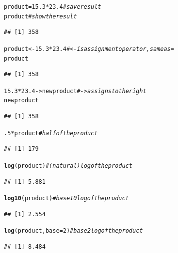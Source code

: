 \documentclass[twoside]{book}\usepackage[]{graphicx}\usepackage[]{xcolor}
\makeatletter
\newcommand{\hlnum}[1]{\textcolor[rgb]{0.686,0.059,0.569}{#1}}%
\newcommand{\hlcom}[1]{\textcolor[rgb]{0.678,0.584,0.686}{\textit{#1}}}%
\newcommand{\hlopt}[1]{\textcolor[rgb]{0,0,0}{#1}}%
\newcommand{\hlstd}[1]{\textcolor[rgb]{0.345,0.345,0.345}{#1}}%
\newcommand{\hlkwb}[1]{\textcolor[rgb]{0.69,0.353,0.396}{#1}}%
\newcommand{\hlkwc}[1]{\textcolor[rgb]{0.333,0.667,0.333}{#1}}%
\newcommand{\hlkwd}[1]{\textcolor[rgb]{0.737,0.353,0.396}{\textbf{#1}}}%
\newenvironment{kframe}{%
 \def\at@end@of@kframe{}%
 \ifinner\ifhmode%
  \def\at@end@of@kframe{\end{minipage}}%
  \begin{minipage}{\columnwidth}%
 \fi\fi%
 \def\FrameCommand##1{\hskip\@totalleftmargin \hskip-\fboxsep
 \colorbox{shadecolor}{##1}\hskip-\fboxsep
     \hskip-\linewidth \hskip-\@totalleftmargin \hskip\columnwidth}%
 \MakeFramed {\advance\hsize-\width
   \@totalleftmargin\z@ \linewidth\hsize
   \@setminipage}}%
 {\par\unskip\endMakeFramed%
 \at@end@of@kframe}
\newenvironment{knitrout}{}{} %
\makeatother
\begin{document}
\begin{knitrout}
\color{fgcolor}\begin{kframe}
\begin{alltt}
\hlstd{product} \hlkwb{=} \hlnum{15.3} \hlopt{*} \hlnum{23.4}       \hlcom{# save result}
\hlstd{product}                     \hlcom{# show the result}
\end{alltt}
\begin{verbatim}
## [1] 358
\end{verbatim}
\begin{alltt}
\hlstd{product} \hlkwb{<-} \hlnum{15.3} \hlopt{*} \hlnum{23.4}      \hlcom{# <- is assignment operator, same as =}
\hlstd{product}
\end{alltt}
\begin{verbatim}
## [1] 358
\end{verbatim}
\begin{alltt}
\hlnum{15.3} \hlopt{*} \hlnum{23.4} \hlkwb{->} \hlstd{newproduct}   \hlcom{# -> assigns to the right}
\hlstd{newproduct}
\end{alltt}
\begin{verbatim}
## [1] 358
\end{verbatim}
\begin{alltt}
\hlnum{.5} \hlopt{*} \hlstd{product}                \hlcom{# half of the product}
\end{alltt}
\begin{verbatim}
## [1] 179
\end{verbatim}
\begin{alltt}
\hlkwd{log}\hlstd{(product)}                \hlcom{# (natural) log of the product}
\end{alltt}
\begin{verbatim}
## [1] 5.881
\end{verbatim}
\begin{alltt}
\hlkwd{log10}\hlstd{(product)}              \hlcom{# base 10 log of the product}
\end{alltt}
\begin{verbatim}
## [1] 2.554
\end{verbatim}
\begin{alltt}
\hlkwd{log}\hlstd{(product,} \hlkwc{base} \hlstd{=} \hlnum{2}\hlstd{)}        \hlcom{# base 2 log of the product}
\end{alltt}
\begin{verbatim}
## [1] 8.484
\end{verbatim}
\end{kframe}
\end{knitrout}
\end{document}
